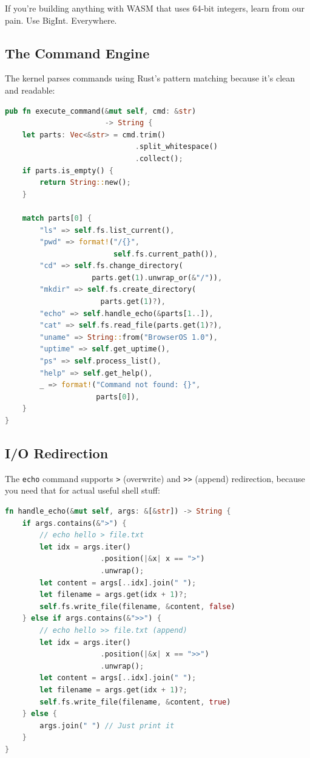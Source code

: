 \documentclass[conference]{IEEEtran}
\begin{document}
If you're building anything with WASM that uses 64-bit integers, learn from our pain. Use BigInt. Everywhere.

\subsection{The Command Engine}

The kernel parses commands using Rust's pattern matching because it's clean and readable:

\begin{lstlisting}[language=Rust, caption=Command Dispatch]
pub fn execute_command(&mut self, cmd: &str) 
                       -> String {
    let parts: Vec<&str> = cmd.trim()
                              .split_whitespace()
                              .collect();
    if parts.is_empty() { 
        return String::new(); 
    }
    
    match parts[0] {
        "ls" => self.fs.list_current(),
        "pwd" => format!("/{}", 
                         self.fs.current_path()),
        "cd" => self.fs.change_directory(
                    parts.get(1).unwrap_or(&"/")),
        "mkdir" => self.fs.create_directory(
                      parts.get(1)?),
        "echo" => self.handle_echo(&parts[1..]),
        "cat" => self.fs.read_file(parts.get(1)?),
        "uname" => String::from("BrowserOS 1.0"),
        "uptime" => self.get_uptime(),
        "ps" => self.process_list(),
        "help" => self.get_help(),
        _ => format!("Command not found: {}", 
                     parts[0]),
    }
}
\end{lstlisting}

\subsection{I/O Redirection}

The \texttt{echo} command supports \texttt{>} (overwrite) and \texttt{>>} (append) redirection, because you need that for actual useful shell stuff:

\begin{lstlisting}[language=Rust, caption=Echo with Redirection]
fn handle_echo(&mut self, args: &[&str]) -> String {
    if args.contains(&">") {
        // echo hello > file.txt
        let idx = args.iter()
                      .position(|&x| x == ">")
                      .unwrap();
        let content = args[..idx].join(" ");
        let filename = args.get(idx + 1)?;
        self.fs.write_file(filename, &content, false)
    } else if args.contains(&">>") {
        // echo hello >> file.txt (append)
        let idx = args.iter()
                      .position(|&x| x == ">>")
                      .unwrap();
        let content = args[..idx].join(" ");
        let filename = args.get(idx + 1)?;
        self.fs.write_file(filename, &content, true)
    } else {
        args.join(" ") // Just print it
    }
}
\end{lstlisting}
\end{document}
